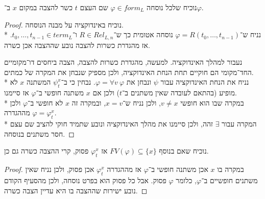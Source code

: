 \subquestion{}
נוכיח שלכל נוסחה $\varphi \in form_L$ שם העצם $t$ כשר להצבה במקום $x$ ב־$\varphi$.
\begin{proof}
	נוכיח באינדוקציה על מבנה הנוסחה. \\*
	נניח ש־$\varphi = R(t_0, \dots, t_{n - 1})$ נוסחה אטומית כך ש־$R \in Rel_{L, n}$ ו־$t_0, \dots, t_{n - 1} \in term_L$.
	אז מהגדרת כשרות להצבה נובע שההצבה אכן כשרה.

	נעבור למהלך האינדוקציה.
	למעשה, מהגדרת כשרות להצבה, הצבה ביחסים דו־מקומיים החד־מקומי הם חוקיים תחת הנחת האינדוקציה, ולכן מספיק שנבחן את המקרה של כמתים. \\*
	נניח את הנחת האינדוקציה עבור $\psi$ ונבחן את $\varphi = \forall v\ \varphi$.
	נבחין כי ב־$\psi_t^x$ המשתנה $x$ לא מופיע (בהתאם לעובדה שאין משתנים ב־$t$) ולכן אם $x$ משתנה חופשי ב־$\varphi$ אז סיימנו. \\*
	במקרה שבו הוא חופשי $v \ne x$, ולכן נניח ש־$x = v$, ובמקרה זה $x$ לא חופשי ב־$\varphi$ ולכן מההגדרה $\varphi = \varphi_t^x$. \\*
	המקרה עבור $\exists$ זהה, ולכן סיימנו את מהלך האינדוקציה ונובע שתמיד חוקי להציב שם עצם חסר משתנים בנוסחה.
\end{proof}

\subquestion{}
נוכיח שאם בנוסף $FV(\varphi) \subseteq \{x\}$ אז $\varphi_t^x$ פסוק, קרי ההצבה כשרה גם כן.
\begin{proof}
	במקרה בו $x$ אכן משתנה חופשי ב־$\varphi$ אז מההגדרה $\varphi_t^x$ אכן פסוק, ולכן נניח שאין משתנים חופשיים ב־$\varphi$, כלומר $\varphi$ פסוק.
	אבל כל פסוק הוא בפרט נוסחה, ולכן מהסעיף הקודם נובע ישירות שההצבה בו היא עדיין הצבה כשרה.
\end{proof}


